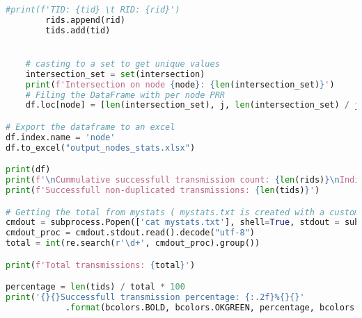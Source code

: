 \begin{lstlisting}[language=Python, caption = Python Script that search for duplications\, check for successful transmissions and find out the overall and individual node PDRs, label=lst:DER]
        #print(f'TID: {tid} \t RID: {rid}')
        rids.append(rid)
        tids.add(tid)


    # casting to a set to get unique values    
    intersection_set = set(intersection)
    print(f'Intersection on node {node}: {len(intersection_set)}')
    # Filing the DataFrame with per node PRR 
    df.loc[node] = [len(intersection_set), j, len(intersection_set) / j*100] # j is the total for each node 

# Export the dataframe to an excel 
df.index.name = 'node'
df.to_excel("output_nodes_stats.xlsx")

print(df)
print(f'\nCummulative successfull transmission count: {len(rids)}\nIndividual count: {Counter(rids)}')
print(f'Successfull non-duplicated transmissions: {len(tids)}')    

# Getting the total from mystats ( mystats.txt is created with a custom script embedded in the simulator code)
cmdout = subprocess.Popen(['cat mystats.txt'], shell=True, stdout = subprocess.PIPE)
cmdout_proc = cmdout.stdout.read().decode("utf-8")
total = int(re.search(r'\d+', cmdout_proc).group())

print(f'Total transmissions: {total}')

percentage = len(tids) / total * 100
print('{}{}Successfull transmission percentage: {:.2f}%{}{}'
            .format(bcolors.BOLD, bcolors.OKGREEN, percentage, bcolors.ENDC, bcolors.ENDC))
\end{lstlisting}





